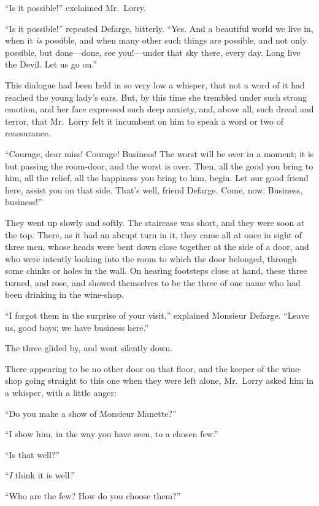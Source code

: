 ``Is it possible!'' exclaimed Mr.\ Lorry.

``Is it possible!'' repeated Defarge, bitterly.  ``Yes.  And a beautiful
world we live in, when it \emph{is} possible, and when many other such
things are possible, and not only possible, but done---done, see
you!---under that sky there, every day.  Long live the Devil.  Let us
go on.''

This dialogue had been held in so very low a whisper, that not a word
of it had reached the young lady's ears.  But, by this time she
trembled under such strong emotion, and her face expressed such deep
anxiety, and, above all, such dread and terror, that Mr.\ Lorry felt
it incumbent on him to speak a word or two of reassurance.

``Courage, dear miss!  Courage!  Business!  The worst will be over
in a moment; it is but passing the room-door, and the worst is over.
Then, all the good you bring to him, all the relief, all the
happiness you bring to him, begin.  Let our good friend here,
assist you on that side.  That's well, friend Defarge.  Come, now.
Business, business!''

They went up slowly and softly.  The staircase was short, and they
were soon at the top.  There, as it had an abrupt turn in it, they
came all at once in sight of three men, whose heads were bent down
close together at the side of a door, and who were intently looking
into the room to which the door belonged, through some chinks or
holes in the wall.  On hearing footsteps close at hand, these three
turned, and rose, and showed themselves to be the three of one name
who had been drinking in the wine-shop.

``I forgot them in the surprise of your visit,'' explained Monsieur
Defarge.  ``Leave us, good boys; we have business here.''

The three glided by, and went silently down.

There appearing to be no other door on that floor, and the keeper of
the wine-shop going straight to this one when they were left alone,
Mr.\ Lorry asked him in a whisper, with a little anger:

``Do you make a show of Monsieur Manette?''

``I show him, in the way you have seen, to a chosen few.''

``Is that well?''

``\emph{I} think it is well.''

``Who are the few?  How do you choose them?''

